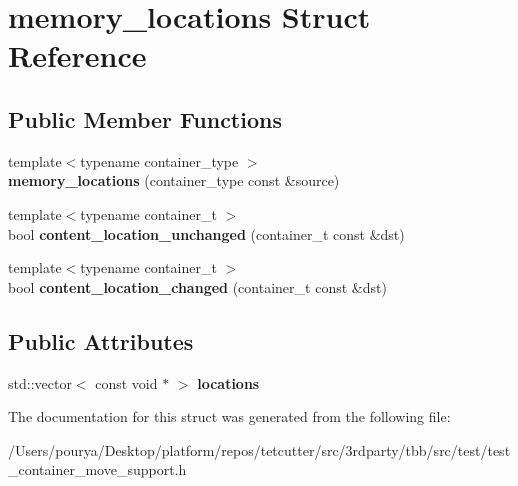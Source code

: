 \hypertarget{structmemory__locations}{}\section{memory\+\_\+locations Struct Reference}
\label{structmemory__locations}
\subsection*{Public Member Functions}
\begin{DoxyCompactItemize}
\item 
\hypertarget{structmemory__locations_a7821862acd4f9a7bf1b249edf524ec99}{}{\footnotesize template$<$typename container\+\_\+type $>$ }\\{\bfseries memory\+\_\+locations} (container\+\_\+type const \&source)\label{structmemory__locations_a7821862acd4f9a7bf1b249edf524ec99}

\item 
\hypertarget{structmemory__locations_ac509ecba138e9e94a7338fdf89e041c1}{}{\footnotesize template$<$typename container\+\_\+t $>$ }\\bool {\bfseries content\+\_\+location\+\_\+unchanged} (container\+\_\+t const \&dst)\label{structmemory__locations_ac509ecba138e9e94a7338fdf89e041c1}

\item 
\hypertarget{structmemory__locations_a5b51faa95e3bf3751f25362c91290b63}{}{\footnotesize template$<$typename container\+\_\+t $>$ }\\bool {\bfseries content\+\_\+location\+\_\+changed} (container\+\_\+t const \&dst)\label{structmemory__locations_a5b51faa95e3bf3751f25362c91290b63}

\end{DoxyCompactItemize}
\subsection*{Public Attributes}
\begin{DoxyCompactItemize}
\item 
\hypertarget{structmemory__locations_ae21ad1fa359386cad8083e11f9f3b81e}{}std\+::vector$<$ const void $\ast$ $>$ {\bfseries locations}\label{structmemory__locations_ae21ad1fa359386cad8083e11f9f3b81e}

\end{DoxyCompactItemize}


The documentation for this struct was generated from the following file\+:\begin{DoxyCompactItemize}
\item 
/\+Users/pourya/\+Desktop/platform/repos/tetcutter/src/3rdparty/tbb/src/test/test\+\_\+container\+\_\+move\+\_\+support.\+h\end{DoxyCompactItemize}
